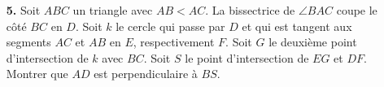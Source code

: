 \documentclass[language=french,style=exam]{smo}
\begin{document}
\begin{enumerate}
\bigskip

\item[\textbf{5.}] 
Soit $ABC$ un triangle avec $AB < AC$. La bissectrice de $\angle BAC$ coupe le côté $BC$ en $D$. Soit $k$ le cercle qui passe par $D$ et qui est tangent aux segments $AC$ et $AB$ en $E$, respectivement $F$. Soit $G$ le deuxième point d'intersection de $k$ avec $BC$. Soit $S$ le point d'intersection de $EG$ et $DF$. Montrer que $AD$ est perpendiculaire à $BS$.
\bigskip

\end{enumerate}

\vspace{1cm}

\end{document}
